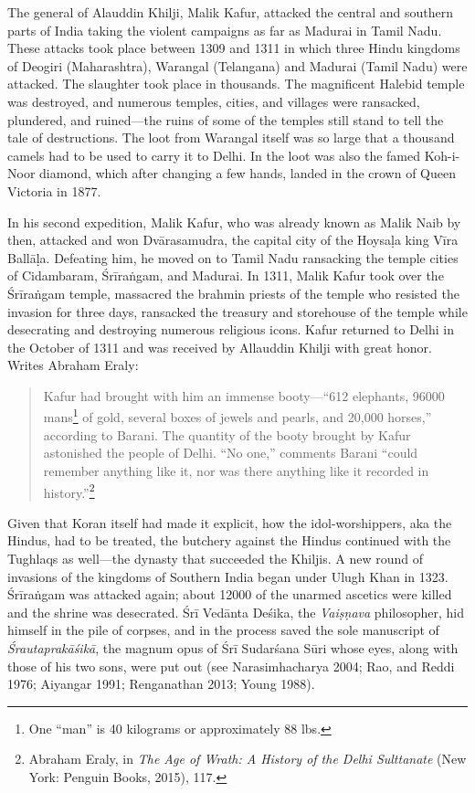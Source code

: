 The general of Alauddin Khilji, Malik Kafur, attacked the central and southern parts of India taking the violent campaigns as far as Madurai in Tamil Nadu. These attacks took place between 1309 and 1311 in which three Hindu kingdoms of Deogiri (Maharashtra), Warangal (Telangana) and Madurai (Tamil Nadu) were attacked. The slaughter took place in thousands. The magnificent Halebid temple was destroyed, and numerous temples, cities, and villages were ransacked, plundered, and ruined—the ruins of some of the temples still stand to tell the tale of destructions. The loot from Warangal itself was so large that a thousand camels had to be used to carry it to Delhi. In the loot was also the famed Koh-i-Noor diamond, which after changing a few hands, landed in the crown of Queen Victoria in 1877.

In his second expedition, Malik Kafur, who was already known as Malik Naib by then, attacked and won Dvārasamudra, the capital city of the Hoysaḷa king Vīra Ballāḷa. Defeating him, he moved on to Tamil Nadu ransacking the temple cities of Cidambaram, Śrīraṅgam, and Madurai. In 1311, Malik Kafur took over the Śrīraṅgam temple, massacred the brahmin priests of the temple who resisted the invasion for three days, ransacked the treasury and storehouse of the temple while desecrating and destroying numerous religious icons. Kafur returned to Delhi in the October of 1311 and was received by Allauddin Khilji with great honor. Writes Abraham Eraly:
\begin{quote}
Kafur had brought with him an immense booty—“612 elephants, 96000 mans\footnote{One “man” is 40 kilograms or approximately 88 lbs.} of gold, several boxes of jewels and pearls, and 20,000 horses,” according to Barani. The quantity of the booty brought by Kafur astonished the people of Delhi. “No one,” comments Barani “could remember anything like it, nor was there anything like it recorded in history.”\footnote{Abraham Eraly, in \textit{The Age of Wrath: A History of the Delhi Sulttanate} (New York: Penguin Books, 2015), 117.}
\end{quote}
Given that Koran itself had made it explicit, how the idol-worshippers, aka the Hindus, had to be treated, the butchery against the Hindus continued with the Tughlaqs as well—the dynasty that succeeded the Khiljis. A new round of invasions of the kingdoms of Southern India began under Ulugh Khan in 1323. Śrīraṅgam was attacked again; about 12000 of the unarmed ascetics were killed and the shrine was desecrated. Śrī Vedānta Deśika, the \textit{Vaiṣṇava} philosopher, hid himself in the pile of corpses, and in the process saved the sole manuscript of \textit{Śrautaprakāśikā}, the magnum opus of Śrī Sudarśana Sūri whose eyes, along with those of his two sons, were put out (see Narasimhacharya 2004; Rao, and Reddi 1976; Aiyangar 1991; Renganathan 2013; Young 1988). 

